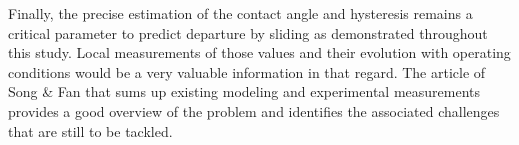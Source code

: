 Finally, the precise estimation of the contact angle and hysteresis remains a critical parameter to predict departure by sliding as demonstrated throughout this study. Local measurements of those values and their evolution with operating conditions would be a very valuable information in that regard. The article of Song \& Fan \cite{song_temperature_2021} that sums up existing modeling and experimental measurements provides a good overview of the problem and identifies the associated challenges that are still to be tackled.



